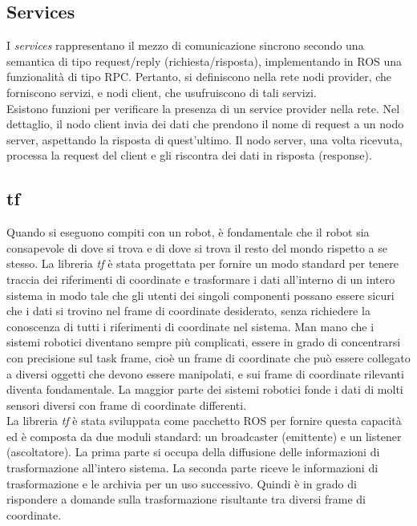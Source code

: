 \subsection{Services}
I \emph{services} rappresentano il mezzo di comunicazione sincrono secondo una semantica di tipo request/reply (richiesta/risposta), implementando in \acs{ROS} una funzionalità di tipo \ac{RPC}. Pertanto, si definiscono nella rete nodi provider, che forniscono servizi, e nodi client, che usufruiscono di tali servizi.\\

Esistono funzioni per verificare la presenza di un service provider nella rete. Nel dettaglio, il nodo client invia dei dati che prendono il nome di request a un nodo server, aspettando la risposta di quest’ultimo. Il nodo server, una volta ricevuta, processa la request del client e gli riscontra dei dati in risposta (response).

\subsection{tf}
Quando si eseguono compiti con un robot, è fondamentale che il robot sia consapevole di dove si trova e di dove si trova il resto del mondo rispetto a se stesso. La libreria \emph{tf} \cite{tf} è stata progettata per fornire un modo standard per tenere traccia dei riferimenti di coordinate e trasformare i dati all'interno di un intero sistema in modo tale che gli utenti dei singoli componenti possano essere sicuri che i dati si trovino nel frame di coordinate desiderato, senza richiedere la conoscenza di tutti i riferimenti di coordinate nel sistema. Man mano che i sistemi robotici diventano sempre più complicati, essere in grado di concentrarsi con precisione sul task frame, cioè un frame di coordinate che può essere collegato a diversi oggetti che devono essere manipolati, e sui frame di coordinate rilevanti diventa fondamentale. La maggior parte dei sistemi robotici fonde i dati di molti sensori diversi con frame di coordinate differenti.\\

La libreria \emph{tf} è stata sviluppata come pacchetto \acs{ROS} per fornire questa capacità ed è composta da due moduli standard: un broadcaster (emittente) e un listener (ascoltatore). La prima parte si occupa della diffusione delle informazioni di trasformazione all'intero sistema. La seconda parte riceve le informazioni di trasformazione e le archivia per un uso successivo. Quindi è in grado di rispondere a domande sulla trasformazione risultante tra diversi frame di coordinate.\\

